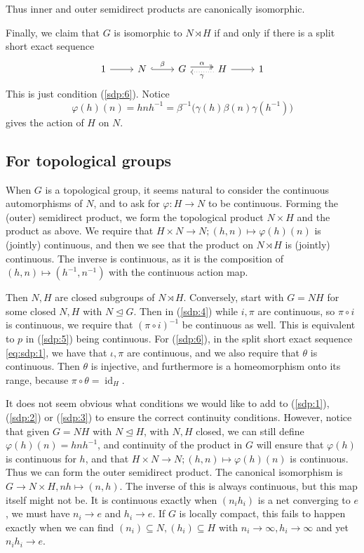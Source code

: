 \documentclass[twoside,a4paper,12pt]{article}
\theoremstyle{plain}
\theoremstyle{definition}
\newcommand{\id}{\operatorname{id}}
\begin{document}
Thus inner and outer semidirect products are canonically isomorphic.

Finally, we claim that $G$ is isomorphic to $N \rtimes H$ if and only if there is a split short exact
sequence
\[ \begin{tikzcd}
1 \arrow[r] &
N \arrow[r, hook, "\beta"] &
G \arrow[r, twoheadrightarrow, shift left=0.6ex, "\alpha"] &
H \arrow[r] \arrow[l, dotted, shift left=0.6ex, "\gamma"] & 1
\end{tikzcd} \]
This is just condition (\ref{sdp:6}).  Notice 
\[ \varphi(h)(n) = hnh^{-1} = \beta^{-1}\big( \gamma(h) \beta(n) \gamma(h^{-1}) \big) \]
gives the action of $H$ on $N$.


\subsection{For topological groups}

When $G$ is a topological group, it seems natural to consider the continuous automorphisms of $N$,
and to ask for $\varphi:H\rightarrow N$ to be continuous.  Forming the (outer) semidirect product, we
form the topological product $N \times H$ and the product as above.  We require that $H\times N
\rightarrow N; (h,n) \mapsto \varphi(h)(n)$ is (jointly) continuous, and then we see that the
product on $N \rtimes H$ is (jointly) continuous.  The inverse is continuous, as it is the composition
of $(h,n) \mapsto (h^{-1}, n^{-1})$ with the continuous action map.

Then $N, H$ are closed subgroups of $N\rtimes H$.  Conversely, start with $G=NH$ for some closed
$N,H$ with $N \unlhd G$.  Then in (\ref{sdp:4}) while $i,\pi$ are continuous, so $\pi\circ i$ is continuous,
we require that $(\pi\circ i)^{-1}$ be continuous as well.  This is equivalent to $p$ in (\ref{sdp:5})
being continuous.  For (\ref{sdp:6}), in the split short exact sequence \eqref{eq:sdp:1}, we have that
$\iota,\pi$ are continuous, and we also require that $\theta$ is continuous.  Then $\theta$ is injective,
and furthermore is a homeomorphism onto its range, because $\pi\circ\theta=\id_H$.

It does not seem obvious what conditions we would like to add to (\ref{sdp:1}), (\ref{sdp:2}) or (\ref{sdp:3})
to ensure the correct continuity conditions.  However, notice that given $G=NH$ with $N\unlhd H$, with
$N, H$ closed, we can still define $\varphi(h)(n) = hnh^{-1}$, and continuity of the product in $G$ will
ensure that $\varphi(h)$ is continuous for $h$, and that $H\times N \rightarrow N;
(h,n) \mapsto \varphi(h)(n)$ is continuous.  Thus we can form the outer semidirect product.  The canonical
isomorphism is $G \rightarrow N \times H, nh \mapsto (n,h)$.  The inverse of this is always continuous,
but this map itself might not be.  It is continuous exactly when $(n_i h_i)$ is a net converging to
$e$, we must have $n_i\rightarrow e$ and $h_i\rightarrow e$.  If $G$ is locally compact, this fails to
happen exactly when we can find $(n_i) \subseteq N, (h_i)\subseteq H$ with $n_i\rightarrow \infty,
h_i\rightarrow\infty$ and yet $n_ih_i\rightarrow e$.
\end{document}
